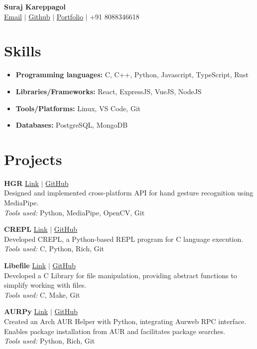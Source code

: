 \documentclass[a4paper,10pt]{article}
\newcommand{\projectentry}[5]{
  \noindent
  \textbf{#1} \hfill
  \href{#4}{Link} $|$ \href{#5}{GitHub} \\
  #2 \\
  \textit{Tools used:} #3
  \vspace{6pt} %
}
\begin{document}
\pagestyle{empty}

\begin{center}
  \textbf{\LARGE Suraj Kareppagol} \\
  \vspace{6pt}
  \href{surajkareppagol.social@gmail.com}{Email} $|$ \href{https://github.com/surajkareppagol}{Github} $|$ \href{https://suraj-kareppagol.web.app/}{Portfolio} $|$ +91 8088346618
\end{center}

\section*{Skills}
\begin{itemize}[label=--,left=0pt, align=left]
  \item \textbf{Programming languages:} C, C++, Python, Javascript, TypeScript, Rust
  \item \textbf{Libraries/Frameworks:} React, ExpressJS, VueJS, NodeJS
  \item \textbf{Tools/Platforms:} Linux, VS Code, Git
  \item \textbf{Databases:} PostgreSQL, MongoDB
\end{itemize}

\section*{Projects}
\projectentry{HGR}{
  Designed and implemented cross-platform API for hand gesture recognition using MediaPipe.
}{
  Python, MediaPipe, OpenCV, Git
}{https://github.com/surajkareppagol/HGR}{https://github.com/surajkareppagol/HGR}

\projectentry{CREPL}{
  Developed CREPL, a Python-based REPL program for C language execution.
}{
  C, Python, Rich, Git
}{https://github.com/surajkareppagol/CREPL}{https://github.com/surajkareppagol/CREPL}

\projectentry{Libefile}{
  Developed a C Library for file manipulation, providing abstract functions to simplify working with files.
}{
  C, Make, Git
}{https://github.com/surajkareppagol/Lib-efile}{https://github.com/surajkareppagol/Lib-efile}

\projectentry{AURPy}{
  Created an Arch AUR Helper with Python, integrating Aurweb RPC interface. Enables package installation from AUR and facilitates package searches.
}{
  Python, Rich, Git
}{https://github.com/surajkareppagol/AURPy}{https://github.com/surajkareppagol/AURPy}
\end{document}
